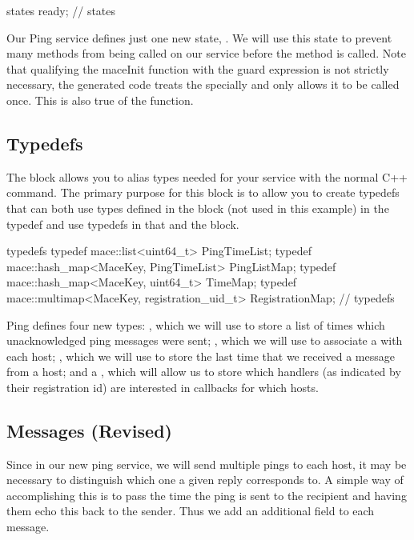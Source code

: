\begin{programlisting}
states {
  ready;
} // states
\end{programlisting}

Our Ping service defines just one new state, .  We will
use this state to prevent many methods from being called on our service before
the  method is called.  Note that qualifying the maceInit
function with the guard expression is not strictly necessary, the generated
code treats the  specially and only allows it to be called
once.  This is also true of the  function.


\subsection{Typedefs}

The  block allows you to alias types needed for your
service with the normal C++  command.  The primary purpose
for this block is to allow you to create typedefs that can both use types
defined in the  block (not used in this example) in the
typedef and use typedefs in that and the  block.

\begin{programlisting}
typedefs {
  typedef mace::list<uint64_t> PingTimeList;
  typedef mace::hash_map<MaceKey, PingTimeList> PingListMap;
  typedef mace::hash_map<MaceKey, uint64_t> TimeMap;
  typedef mace::multimap<MaceKey, registration_uid_t> RegistrationMap;
} // typedefs
\end{programlisting}

Ping defines four new types: , which we will use to
store a list of times which unacknowledged ping messages were sent;
, which we will use to associate a
 with each host; , which we will use
to store the last time that we received a  message from a
host; and a , which will allow us to store which
handlers (as indicated by their registration id) are interested in callbacks
for which hosts.

\subsection{Messages (Revised)}

Since in our new ping service, we will send multiple pings to each host, 
it may be necessary to distinguish which one a given reply corresponds to.
A simple way of accomplishing this is to pass the time the ping is sent
to the recipient and having them echo this back to the sender.  Thus we add
an additional field to each message.

